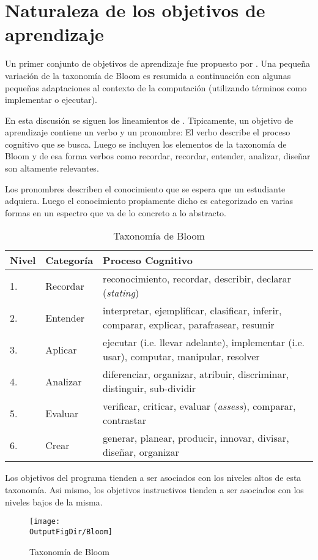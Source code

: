 \section{Naturaleza de los objetivos de aprendizaje}
Un primer conjunto de objetivos de aprendizaje fue propuesto por \cite{Bloom56Taxonomy}. 
Una pequeña variación de la taxonomía de Bloom es resumida a continuación con algunas 
pequeñas adaptaciones al contexto de la computación (utilizando términos como implementar o ejecutar).

En esta discusión se siguen los lineamientos de \cite{Anderson2001Bloom}. 
Tipicamente, un objetivo de aprendizaje contiene un verbo y un pronombre:
El verbo describe el proceso cognitivo que se busca. Luego se incluyen los 
elementos de la taxonomía de Bloom y de esa forma verbos como 
recordar, recordar, entender, analizar, diseñar son altamente relevantes.

Los pronombres describen el conocimiento que se espera que un estudiante adquiera. Luego el conocimiento 
propiamente dicho es categorizado en varias formas en un espectro que va de lo concreto a lo abstracto.

\begin{center}
\begin{table}[h!]
\begin{tabularx}{\textwidth}{|l|l|X|}\hline
\textbf{Nivel} & \textbf{Categoría}      & \textbf{Proceso Cognitivo} \\ \hline
1.     & Recordar 	& reconocimiento, recordar, describir, declarar (\textit{stating}) \\ \hline
2.     & Entender 	& interpretar, ejemplificar, clasificar, inferir, comparar, explicar, parafrasear, resumir \\ \hline
3.     & Aplicar        & ejecutar (i.e. llevar adelante), implementar (i.e. usar), computar, manipular, resolver \\ \hline
4.     & Analizar      	& diferenciar, organizar, atribuir, discriminar, distinguir, sub-dividir \\ \hline 
5.     & Evaluar     	& verificar, criticar, evaluar (\textit{assess}), comparar, contrastar \\ \hline
6.     & Crear       	& generar, planear, producir, innovar, divisar, diseñar, organizar \\ \hline
\end{tabularx}
\label{tab:BloomTaxonomy}
\caption{Taxonomía de Bloom}
\end{table}
\end{center}

Los objetivos del programa tienden a ser asociados con los niveles altos de esta taxonomía. Asi mismo, 
los objetivos instructivos tienden a ser asociados con los niveles bajos de la misma.

\begin{figure}[h!]
\texttt{[image: \\OutputFigDir/Bloom]}
\label{fig:BloomTaxonomy}
\caption{Taxonomía de Bloom}
\end{figure} 
